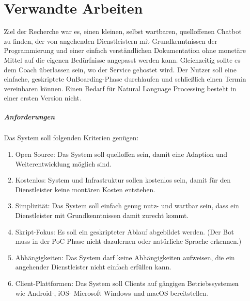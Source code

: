 \label{Verwandte Arbeiten}
\chapter{Verwandte Arbeiten}

    Ziel der Recherche war es, einen kleinen, selbst wartbaren, quelloffenen Chatbot zu finden, der von angehenden Dienstleistern mit Grundkenntnissen der Programmierung und einer einfach verständlichen Dokumentation ohne monetäre Mittel auf die eigenen Bedürfnisse angepasst werden kann. Gleichzeitig sollte es dem Coach überlassen sein, wo der Service gehostet wird. Der Nutzer soll eine einfache, geskriptete OnBoarding-Phase durchlaufen und schließlich einen Termin vereinbaren können. Einen Bedarf für Natural Language Processing besteht in einer ersten Version nicht. 

    \paragraph{Anforderungen}
    Das System soll folgenden Kriterien genügen:
    \begin{enumerate}
        \item Open Source: Das System soll quelloffen sein, damit eine Adaption und Weiterentwicklung möglich sind.
        \item Kostenlos: System und Infrastruktur sollen kostenlos sein, damit für den Dienstleister keine montären Kosten entstehen.
        \item Simplizität: Das System soll einfach genug nutz- und wartbar sein, dass ein Dienstleister mit Grundkenntnissen damit zurecht kommt.
        \item Skript-Fokus: Es soll ein geskripteter Ablauf abgebildet werden. (Der Bot muss in der PoC-Phase nicht dazulernen oder natürliche Sprache erkennen.) 
        \item Abhängigkeiten: Das System darf keine Abhängigkeiten aufweisen, die ein angehender Dienstleister nicht einfach erfüllen kann.
        \item Client-Plattformen: Das System soll Clients auf gängigen Betriebssystemen wie Android-, iOS- Microsoft Windows und macOS bereitstellen.
    \end{enumerate}

